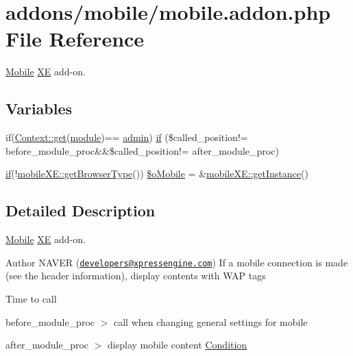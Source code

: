 \hypertarget{mobile_8addon_8php}{}\section{addons/mobile/mobile.addon.\+php File Reference}
\label{mobile_8addon_8php}


\hyperlink{classMobile}{Mobile} \hyperlink{namespaceXE}{XE} add-\/on.  


\subsection*{Variables}
\begin{DoxyCompactItemize}
\item 
if(\hyperlink{classContext_a90ce25d65fe6c9778421cbb36ab3def5}{Context\+::get}(\textquotesingle{}\hyperlink{classmodule}{module}\textquotesingle{})== \textquotesingle{}\hyperlink{classadmin}{admin}\textquotesingle{}) \hyperlink{mobile_8addon_8php_a13d720e0d3597438cb76873850ce4b63}{if} (\$called\+\_\+position!= \textquotesingle{}before\+\_\+module\+\_\+proc\textquotesingle{}\&\&\$called\+\_\+position!= \textquotesingle{}after\+\_\+module\+\_\+proc\textquotesingle{})
\item 
\hyperlink{menu_2tpl_2js_2jquery_8jstree_8js_acba95bef569cfaee32c4ed0212b2bb92}{if}(!\hyperlink{classmobileXE_a462a4900af63aa2bfbcea2168afbe876}{mobile\+X\+E\+::get\+Browser\+Type}()) \hyperlink{mobile_8addon_8php_a2e1472c6f1bb5b341e95a632164904d0}{\$o\+Mobile} = \&\hyperlink{classmobileXE_a11db662f7f05a929e2559ee6d42fca2c}{mobile\+X\+E\+::get\+Instance}()
\end{DoxyCompactItemize}


\subsection{Detailed Description}
\hyperlink{classMobile}{Mobile} \hyperlink{namespaceXE}{XE} add-\/on. 

\begin{DoxyAuthor}{Author}
N\+A\+V\+ER (\href{mailto:developers@xpressengine.com}{\tt developers@xpressengine.\+com}) If a mobile connection is made (see the header information), display contents with W\+AP tags
\end{DoxyAuthor}
Time to call

before\+\_\+module\+\_\+proc $>$ call when changing general settings for mobile

after\+\_\+module\+\_\+proc $>$ display mobile content \hyperlink{classCondition}{Condition} 

